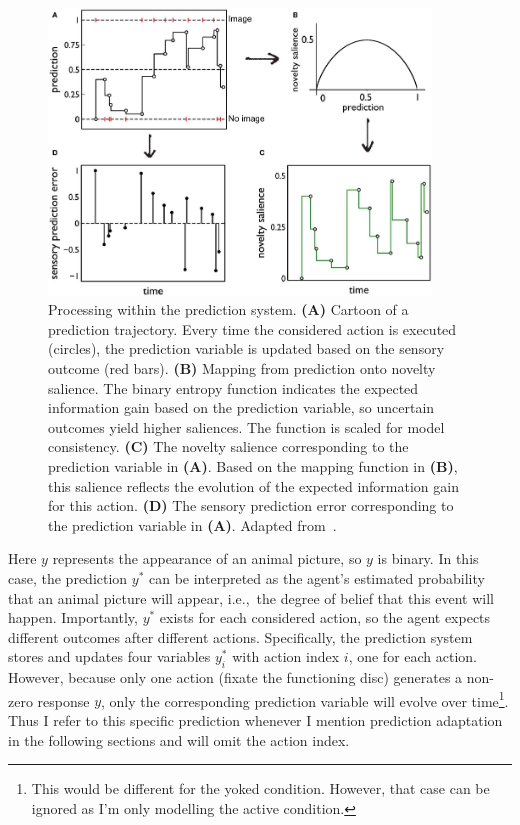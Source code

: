 \documentclass[a4paper]{scrreprt}
\begin{document}
\begin{figure}
\centering
\includegraphics[width=4in]{figs/bolado-gomez13_fig5_3.pdf}
\caption{Processing within the prediction system. \textbf{(A)} Cartoon of a prediction trajectory. Every time the considered action is executed (circles), the prediction variable is updated based on the sensory outcome (red bars).
\textbf{(B)} Mapping from prediction onto novelty salience. The binary entropy function indicates the expected information gain based on the prediction variable, so uncertain outcomes yield higher saliences. The function is scaled for model consistency.
\textbf{(C)} The novelty salience corresponding to the prediction variable in \textbf{(A)}. Based on the mapping function in \textbf{(B)}, this salience reflects the evolution of the expected information gain for this action.
\textbf{(D)} The sensory prediction error corresponding to the prediction variable in \textbf{(A)}.
Adapted from~\cite{bg13}.}
\label{fig:prediction}
\end{figure}

Here $y$ represents the appearance of an animal picture, so $y$ is binary. In this case, the prediction $y^*$ can be interpreted as the agent's estimated probability that an animal picture will appear, i.e.,~the degree of belief that this event will happen. Importantly, $y^*$ exists for each considered action, so the agent expects different outcomes after different actions. Specifically, the prediction system stores and updates four variables $y^*_i$ with action index $i$, one for each action. However, because only one action (fixate the functioning disc) generates a non-zero response $y$, only the corresponding prediction variable will evolve over time\footnote{This would be different for the yoked condition. However, that case can be ignored as I'm only modelling the active condition.}. Thus I refer to this specific prediction whenever I mention prediction adaptation in the following sections and will omit the action index.
\end{document}
